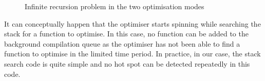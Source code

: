 \documentclass[a4paper,12pt,twoside]{../includes/ThesisStyle}
\begin{document}
\begin{figure}
    \begin{center}
		\hfill
		\caption{Infinite recursion problem in the two optimisation modes}
    \end{center}
\end{figure}

It can conceptually happen that the optimiser starts spinning while searching the stack for a function to optimise. In this case, no function can be added to the background compilation queue as the optimiser has not been able to find a function to optimise in the limited time period. In practice, in our case, the stack search code is quite simple and no hot spot can be detected repeatedly in this code.
\end{document}
